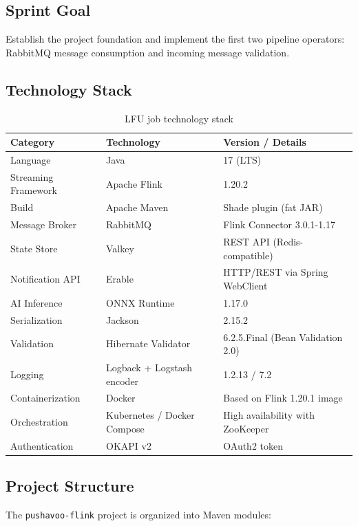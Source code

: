 \subsection{Sprint Goal}

Establish the project foundation and implement the first two pipeline operators: RabbitMQ message consumption and incoming message validation.

\subsection{Technology Stack}

\begin{table}[H]
    \centering
    \caption{LFU job technology stack}
    \label{tab:stack}
    \begin{tabularx}{\textwidth}{l l X}
\toprule
\textbf{Category} & \textbf{Technology} & \textbf{Version / Details} \\
\midrule
Language & Java & 17 (LTS) \\
Streaming Framework & Apache Flink & 1.20.2 \\
Build & Apache Maven & Shade plugin (fat JAR) \\
Message Broker & RabbitMQ & Flink Connector 3.0.1-1.17 \\
State Store & Valkey & REST API (Redis-compatible) \\
Notification API & Erable & HTTP/REST via Spring WebClient \\
AI Inference & ONNX Runtime & 1.17.0 \\
Serialization & Jackson & 2.15.2 \\
Validation & Hibernate Validator & 6.2.5.Final (Bean Validation 2.0) \\
Logging & Logback + Logstash encoder & 1.2.13 / 7.2 \\
Containerization & Docker & Based on Flink 1.20.1 image \\
Orchestration & Kubernetes / Docker Compose & High availability with ZooKeeper \\
Authentication & OKAPI v2 & OAuth2 token \\
\bottomrule
    \end{tabularx}
\end{table}

\subsection{Project Structure}

The \texttt{pushavoo-flink} project is organized into Maven modules:

